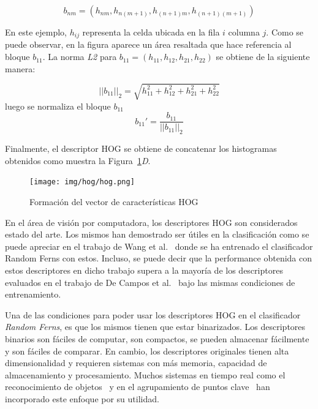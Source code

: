 	$$b_{nm} = (h_{nm}, h_{n(m+1)}, h_{(n+1)m}, h_{(n+1)(m+1)})$$
	
	En este ejemplo, $h_{ij}$ representa la celda ubicada en la fila $i$ columna $j$. Como se puede observar, en la figura aparece un área resaltada que hace referencia al bloque $b_{11}$. La norma \textit{L2} para $b_{11} = (h_{11}, h_{12}, h_{21}, h_{22})$ se obtiene de la siguiente manera:
	
	 $$||b_{11}||_2 = \sqrt{h_{11}^{2} + h_{12}^{2} + h_{21}^{2} + h_{22}^{2}}$$
	 luego se normaliza el bloque $b_{11}$ 
     $$b_{11}' = \frac{b_{11}}{||b_{11}||_2} $$
     
	 Finalmente, el descriptor HOG se obtiene de concatenar los histogramas obtenidos como muestra la Figura~\ref{fig: Vector HOG}\textit{D}.
	
	
		\begin{figure}[htbp]
			\centering
			\centerline{ \texttt{[image: img/hog/hog.png]} }
			\caption[Extracción HOG]{Formación del vector de características HOG}
			\label{fig: Vector HOG}
		\end{figure}
		
	En el área de visión por computadora, los descriptores HOG son considerados estado del arte. Los mismos han demostrado ser útiles en la clasificación como se puede apreciar en el trabajo de Wang et al.~\cite{wang} donde se ha entrenado el clasificador Random Ferns con estos. Incluso, se puede decir que la performance obtenida con estos descriptores en dicho trabajo supera a la mayoría de los descriptores evaluados en el trabajo de De Campos et al.~\cite{dCBV09} bajo las mismas condiciones de entrenamiento.
	
	Una de las condiciones para poder usar los descriptores HOG en el clasificador \textit{Random Ferns}, es que los mismos tienen que estar binarizados. Los descriptores binarios son fáciles de computar, son compactos, se pueden almacenar fácilmente y son fáciles de comparar. En cambio, los descriptores originales tienen alta dimensionalidad y requieren sistemas con más memoria, capacidad de almacenamiento y procesamiento. Muchos sistemas en tiempo real como el reconocimiento de objetos~\cite{SJC08} y en el agrupamiento de puntos clave~\cite{OFL07} han incorporado este enfoque por su utilidad.

